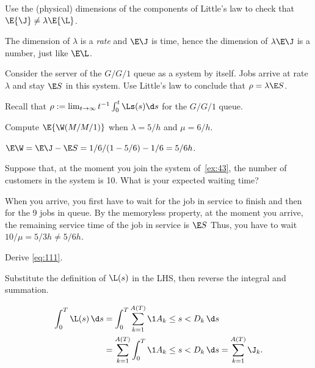 \begin{exercise}\label{ex:42}
  Use
  the (physical) dimensions of the components of Little's law to check that $\E{\J} \neq \lambda \E{\L}$.
\begin{solution}
  The dimension of $\lambda$ is a \emph{rate} and $\E \J$ is time, hence the dimension of $\lambda \E \J$ is a number, just like $\E \L$.
\end{solution}
\end{exercise}


\begin{exercise}\label{ex:37}
 Consider the server of the $G/G/1$ queue as a system by itself.
Jobs arrive at rate $\lambda$ and stay $\E S$ in this system.
Use  Little's law to conclude that  $\rho = \lambda  \E S$.
\begin{solution}
Recall that  $\rho := \lim_{t\to\infty} t^{-1}\int_0^t \Ls(s)\d s$ for the $G/G/1$ queue.
\end{solution}
\end{exercise}


\begin{exercise}\label{ex:43}
Compute $\E{\W(M/M/1)}$  when $\lambda=5/h$ and $\mu=6/h$.
\begin{solution}
$\E\W = \E \J - \E S = 1/6/(1-5/6) - 1/6 = 5/6h$.
\end{solution}
\end{exercise}

\begin{exercise}\label{ex:44}
 Suppose that, at the moment you join the system of~\cref{ex:43}, the number of customers in the system is 10.
What is your  expected waiting time?
\begin{solution}
  When you arrive, you first have to wait for the job in service to finish and then for the 9 jobs in queue.
  By the memoryless property, at the moment you arrive, the remaining service time of the job in service is $\E S$ Thus, you have to wait $10/\mu = 5/3 h \neq 5/6 h$.
\end{solution}
\end{exercise}



\begin{exercise}\label{ex:59}
Derive \cref{eq:111}.
\begin{hint}
 Substitute the definition of $\L(s)$ in the LHS, then reverse the integral and summation.
\end{hint}
\begin{solution}
\begin{equation*}
 \begin{split}
 \int_0^T \L(s)\, \d s & = \int_0^T \sum_{k=1}^{A(T)} \1{A_k \leq s < D_k}\, \d s \\
& = \sum_{k=1}^{A(T)}\int_0^T \1{A_k \leq s < D_k}\, \d s = \sum_{k=1}^{A(T)} \J_k.
 \end{split}
\end{equation*}
\end{solution}
\end{exercise}


